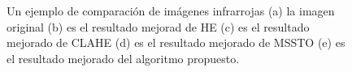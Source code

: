 \documentclass[a4paper, 11 pt, conference]{ieeeconf}      %
\begin{document}
\begin{figure}
    \centering
     \\
    \\
    \caption{Un ejemplo de comparaci\'on de im\'agenes infrarrojas (a) la imagen original (b) es el resultado mejorad de HE (c) es el resultado mejorado de CLAHE (d) es el resultado mejorado de MSSTO (e) es el resultado mejorado del algoritmo propuesto.}
    \label{fig:fig4}

\end{figure}
\end{document}
